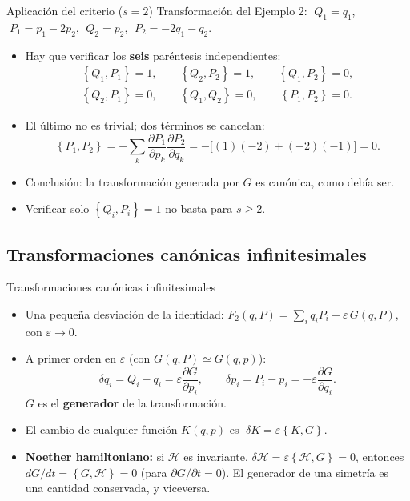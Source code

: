 \documentclass[spanish]{beamer}
\newcommand{\Ham}{\mathcal{H}}               %
\newcommand{\pd}[2]{\frac{\partial #1}{\partial #2}}
\newcommand{\pb}[2]{\left\{#1,#2\right\}}    %
\begin{document}
\begin{frame}{Aplicación del criterio ($s=2$)}
Transformación del Ejemplo 2:
$\;Q_1=q_1$, $\;P_1=p_1-2p_2$, $\;Q_2=p_2$, $\;P_2=-2q_1-q_2$.
\begin{itemize}[<+->]
  \item Hay que verificar los \textbf{seis} paréntesis independientes:
        \begin{gather*}
          \pb{Q_1}{P_1}=1,\qquad\pb{Q_2}{P_2}=1,\qquad
          \pb{Q_1}{P_2}=0,\\
          \pb{Q_2}{P_1}=0,\qquad
          \pb{Q_1}{Q_2}=0,\qquad\pb{P_1}{P_2}=0 .
        \end{gather*}
  \item El último no es trivial; dos términos se cancelan:
        \[
          \pb{P_1}{P_2}=-\sum_k\pd{P_1}{p_k}\pd{P_2}{q_k}=-\big[(1)(-2)+(-2)(-1)\big]=0 .
        \]
  \item Conclusión: la transformación generada por $G$ es canónica, como debía ser.
  \item Verificar solo $\pb{Q_i}{P_i}=1$ no basta para $s\ge2$.
\end{itemize}
\end{frame}

\subsection{Transformaciones canónicas infinitesimales}
\begin{frame}{Transformaciones canónicas infinitesimales}
\begin{itemize}[<+->]
  \item Una pequeña desviación de la identidad:
        $F_2(q,P)=\sum_i q_iP_i+\varepsilon\,G(q,P)$, con $\varepsilon\to0$.
  \item A primer orden en $\varepsilon$ (con $G(q,P)\simeq G(q,p)$):
        \[
          \delta q_i=Q_i-q_i=\varepsilon\pd{G}{p_i},\qquad
          \delta p_i=P_i-p_i=-\varepsilon\pd{G}{q_i}.
        \]
        $G$ es el \textbf{generador} de la transformación.
  \item El cambio de cualquier función $K(q,p)$ es
        $\;\delta K=\varepsilon\pb{K}{G}$.
  \item \textbf{Noether hamiltoniano:} si $\Ham$ es invariante, $\delta\Ham=\varepsilon\pb{\Ham}{G}=0$,
        entonces $dG/dt=\pb{G}{\Ham}=0$ (para $\partial G/\partial t=0$).
        \alert{El generador de una simetría es una cantidad conservada}, y viceversa.
\end{itemize}
\end{frame}
\end{document}
